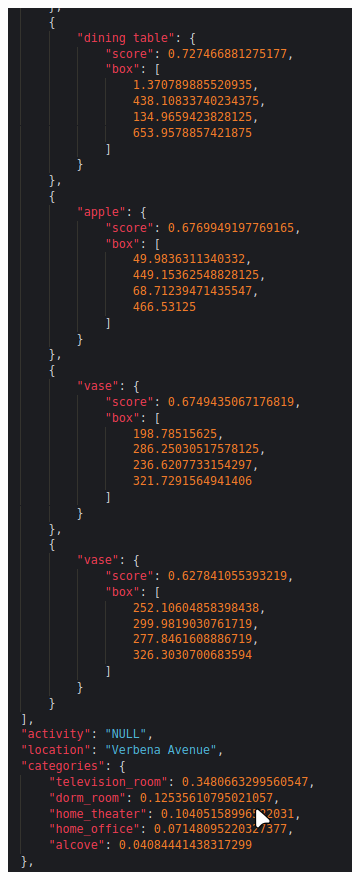 \begin{figure}[H]
\begin{subfigure}{0.3\textwidth}
      \end{subfigure}
      \begin{subfigure}{0.3\textwidth}
      \includegraphics[width=\textwidth]{Sections/4InitialWork/4_images_random/res2.png}

\end{subfigure}
\end{figure}
